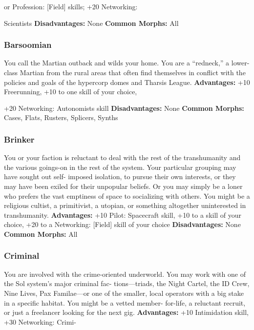or Profession: [Field] skills; +20 Networking: 

Scientists
\textbf{Disadvantages:} None
\textbf{Common Morphs:} All

\subsubsection{Barsoomian}

You call the Martian outback and wilds your home. 
You are a ``redneck,'' a lower-class Martian from the 
rural areas that often find themselves in conflict with 
the policies and goals of the hypercorp domes and 
Tharsis League.
\textbf{Advantages:} +10 Freerunning, +10 to one skill of your choice, 

+20 Networking: Autonomists skill
\textbf{Disadvantages:} None
\textbf{Common Morphs:} Cases, Flats, Rusters, Splicers, Synths

\subsubsection{Brinker}

You or your faction is reluctant to deal with the rest of the 
transhumanity and the various goings-on in the rest of the 
system. Your particular grouping may have sought out self-
imposed isolation, to pursue their own interests, or they may 
have been exiled for their unpopular beliefs. Or you may 
simply be a loner who prefers the vast emptiness of space 
to socializing with others. You might be a religious cultist, a 
primitivist, a utopian, or something altogether uninterested 
in transhumanity.
\textbf{Advantages: }+10 Pilot: Spacecraft skill, +10 to a skill of your 
choice, +20 to a Networking: [Field] skill of your choice
\textbf{Disadvantages:} None
\textbf{Common Morphs:} All

\subsubsection{Criminal}

You are involved with the crime-oriented underworld. You 
may work with one of the Sol system's major criminal fac-
tions—triads, the Night Cartel, the ID Crew, Nine Lives, Pax 
Familae—or one of the smaller, local operators with a big 
stake in a specific habitat. You might be a vetted member-
for-life, a reluctant recruit, or just a freelancer looking for 
the next gig.
\textbf{Advantages:} +10 Intimidation skill, +30 Networking: Crimi-

